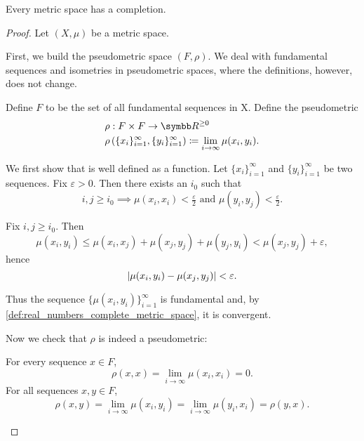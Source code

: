 \begin{theorem}\label{thm:metric_space_completion_existence}
  Every metric space has a completion.
\end{theorem}
\begin{proof}
  Let \( (X, \mu) \) be a metric space.

  \begin{defenum}
     First, we build the pseudometric space \( (F, \rho) \). We deal with fundamental sequences and isometries in pseudometric spaces, where the definitions, however, does not change.

     Define \( F \) to be the set of all fundamental sequences in X. Define the pseudometric
    \begin{align*}
      &\rho: F \times F \to \BB{R}^{\geq 0} \\
      &\rho\left( \{ x_i \}_{i=1}^\infty, \{ y_i \}_{i=1}^\infty \right) \coloneqq \lim_{i \to \infty} \mu(x_i, y_i).
    \end{align*}

    We first show that is well defined as a function. Let \( \{ x_i \}_{i=1}^\infty \) and \( \{ y_i \}_{i=1}^\infty \) be two sequences. Fix \( \varepsilon > 0 \). Then there exists an \( i_0 \) such that
    \begin{equation*}
      i, j \geq i_0 \implies \mu(x_i, x_i) < \tfrac \varepsilon 2 \text{ and } \mu(y_i, y_j) < \tfrac \varepsilon 2.
    \end{equation*}

    Fix \( i, j \geq i_0 \). Then
    \begin{equation*}
      \mu(x_i, y_i) \leq \mu(x_i, x_j) + \mu(x_j, y_j) + \mu(y_j, y_i) < \mu(x_j, y_j) + \varepsilon,
    \end{equation*}
    hence
    \begin{equation*}
      \left\vert \mu(x_i, y_i) - \mu(x_j, y_j) \right\vert < \varepsilon.
    \end{equation*}

    Thus the sequence \( \{ \mu(x_i, y_i) \}_{i=1}^\infty \) is fundamental and, by \cref{def:real_numbers_complete_metric_space}, it is convergent.

    Now we check that \( \rho \) is indeed a pseudometric:
    \begin{description}
       For every sequence \( x \in F \),
      \begin{equation*}
        \rho(x, x) = \lim_{i \to \infty} \mu(x_i, x_i) = 0.
      \end{equation*}
       For all sequences \( x, y \in F \),
      \begin{equation*}
        \rho(x, y) = \lim_{i \to \infty} \mu(x_i, y_i) = \lim_{i \to \infty} \mu(y_i, x_i) = \rho(y, x).
      \end{equation*}


\end{description}
\end{defenum}
\end{proof}
